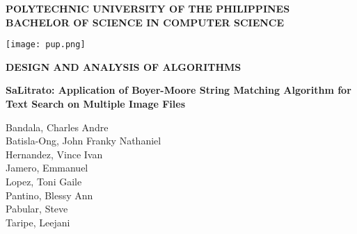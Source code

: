\thispagestyle{empty}

\vspace*{\fill}
\begingroup
\centering

        \textbf{POLYTECHNIC UNIVERSITY OF THE PHILIPPINES\\
        BACHELOR OF SCIENCE IN COMPUTER SCIENCE}\vspace{.5in}

        \noindent\texttt{[image: pup.png]}\vspace{.5in}

        \textbf{DESIGN AND ANALYSIS OF ALGORITHMS}\vspace{.2in}

        \textbf{\Large
            SaLitrato: Application of Boyer-Moore String Matching Algorithm for Text Search on Multiple Image
            Files
        }\vspace{2in}


        Bandala, Charles Andre\\
        Batisla-Ong, John Franky Nathaniel\\
        Hernandez, Vince Ivan\\
        Jamero, Emmanuel\\
        Lopez, Toni Gaile\\
        Pantino, Blessy Ann\\
        Pabular, Steve\\
        Taripe, Leejani\\


    \endgroup
    \vspace*{\fill}


\vspace*{\fill}
